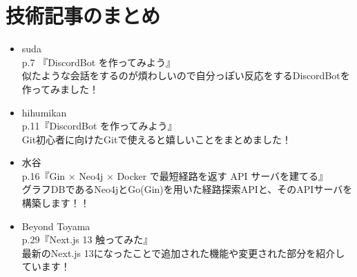 \chapter{技術記事のまとめ}

\begin{itemize}
      \item suda \\
            p.7 『DiscordBot を作ってみよう』 \\
            似たような会話をするのが煩わしいので自分っぽい反応をするDiscordBotを作ってみました！ \\
      \item hihumikan \\
            p.11『DiscordBot を作ってみよう』 \\
            Git初心者に向けたGitで使えると嬉しいことをまとめました！ \\ 
      \item 水谷 \\
            p.16『Gin × Neo4j × Docker で最短経路を返す API サーバを建てる』 \\
            グラフDBであるNeo4jとGo(Gin)を用いた経路探索APIと、そのAPIサーバを構築します！！ \\
      \item Beyond Toyama \\
            p.29『Next.js 13 触ってみた』 \\
            最新のNext.js 13になったことで追加された機能や変更された部分を紹介しています！ \\
\end{itemize} 

